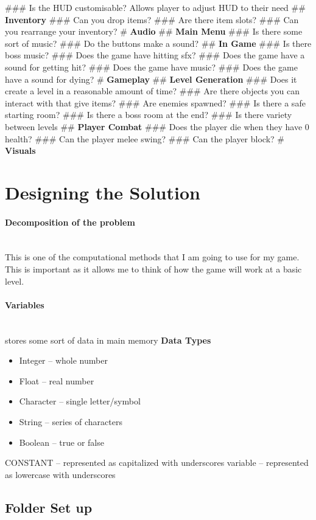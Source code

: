 \documentclass{article}
\newcommand{\parBr}{\vspace{5mm}}%
\newcommand{\myparagraph}[1]{\paragraph{#1}\mbox{}\\} %
\newcommand{\smallBr}{\vspace{1.5mm}}
\begin{document}
\begin{easylist}
### Is the HUD customisable? \linebreak
Allows player to adjust HUD to their need \smallBr
## \textbf{Inventory}
### Can you drop items?
### Are there item slots?
### Can you rearrange your inventory?
# \large{\textbf{Audio}}
## \textbf{Main Menu}
### Is there some sort of music?
### Do the buttons make a sound?
## \textbf{In Game}
### Is there boss music?
### Does the game have hitting sfx?
### Does the game have a sound for getting hit?
### Does the game have music?
### Does the game have a sound for dying?
# \large{\textbf{Gameplay}}
## \textbf{Level Generation}
### Does it create a level in a reasonable amount of time?
### Are there objects you can interact with that give items?
### Are enemies spawned?
### Is there a safe starting room?
### Is there a boss room at the end?
### Is there variety between levels
## \textbf{Player Combat}
### Does the player die when they have 0 health?
### Can the player melee swing?
### Can the player block?
# \large{\textbf{Visuals}}
\end{easylist}

\section{Designing the Solution}
\myparagraph{Decomposition of the problem}   
This is one of the computational methods that I am going to use for my game. This is important as it allows me to think of how the game will work at a basic level. 

\parBr

\myparagraph{Variables}
stores some sort of data in main memory \linebreak \textbf{Data Types}
\begin{itemize}
\item Integer – whole number   
\item Float – real number   
\item Character – single letter/symbol   
\item String – series of characters   
\item Boolean – true or false   
\end{itemize}

CONSTANT – represented as capitalized with underscores
\linebreak
variable – represented as lowercase with underscores 

\subsection{Folder Set up}
\end{document}
